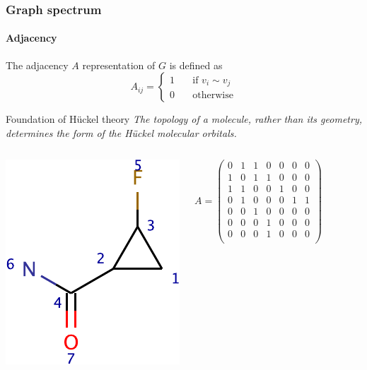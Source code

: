 \documentclass{beamer}
\begin{document}
\begin{frame}
  \frametitle{Graph spectrum}
  \framesubtitle{Adjacency}
  The adjacency $A$ representation of $G$ is defined as
    \[
    A_{ij}=\begin{cases}
    1 & \quad\text{if } v_i \sim v_j\\
    0 & \quad\text{otherwise}
    \end{cases}
    \]
  \begin{block}{Foundation of H\"uckel theory}
    \emph{The topology of a molecule, rather than its geometry, determines
    the form of the H\"uckel molecular orbitals.}
  \end{block}
  
  \begin{columns}
    \centerline{\includegraphics[width=1 true in]{test0-crop}}
    \[
    A = \begin{pmatrix}
0&1&1&0&0&0&0 \\
1&0&1&1&0&0&0 \\
1&1&0&0&1&0&0 \\
0&1&0&0&0&1&1 \\
0&0&1&0&0&0&0 \\
0&0&0&1&0&0&0 \\
0&0&0&1&0&0&0 \\      
    \end{pmatrix}
    \]
  \end{columns}
\end{frame}
\end{document}
